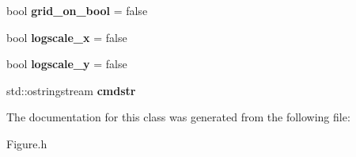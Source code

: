 \begin{DoxyCompactItemize}
\item 
\hypertarget{classkeycpp_1_1_plots_abd0c4449bcd999429a3073e2885708d8}{bool {\bfseries grid\-\_\-on\-\_\-bool} = false}\label{classkeycpp_1_1_plots_abd0c4449bcd999429a3073e2885708d8}

\item 
\hypertarget{classkeycpp_1_1_plots_aa994c8e9f09633b26410ed27ea70a1a1}{bool {\bfseries logscale\-\_\-x} = false}\label{classkeycpp_1_1_plots_aa994c8e9f09633b26410ed27ea70a1a1}

\item 
\hypertarget{classkeycpp_1_1_plots_a605e7e4681e977f5d1d2ff95d72946cb}{bool {\bfseries logscale\-\_\-y} = false}\label{classkeycpp_1_1_plots_a605e7e4681e977f5d1d2ff95d72946cb}

\item 
\hypertarget{classkeycpp_1_1_plots_a0ed0add050a618468cbf2cffe2529bad}{std\-::ostringstream {\bfseries cmdstr}}\label{classkeycpp_1_1_plots_a0ed0add050a618468cbf2cffe2529bad}

\end{DoxyCompactItemize}


The documentation for this class was generated from the following file\-:\begin{DoxyCompactItemize}
\item 
Figure.\-h\end{DoxyCompactItemize}

